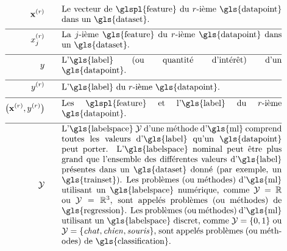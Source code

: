 \begin{align}
	\featurevec^{(\sampleidx)} \quad\quad &\parbox{.75\textwidth}{Le vecteur de \glspl{feature} du $\sampleidx$-ième \gls{datapoint} dans un \gls{dataset}. } \nonumber \\[2mm] \hline \nonumber\\[-5mm]
	\feature_{\featureidx}^{(\sampleidx)}\quad\quad &\parbox{.75\textwidth}{La $\featureidx$-ième \gls{feature} du $\sampleidx$-ième 
		\gls{datapoint} dans un \gls{dataset}.} \nonumber  \\[2mm] \hline \nonumber\\[-5mm]
	\truelabel \quad\quad &\parbox{.75\textwidth}{L'\gls{label} (ou quantité d’intérêt) d’un \gls{datapoint}.} \nonumber \\[2mm] \hline \nonumber\\[-5mm]
	\truelabel^{(\sampleidx)} \quad\quad &\parbox{.75\textwidth}{L'\gls{label} du $\sampleidx$-ième \gls{datapoint}.} \nonumber \\[2mm] \hline \nonumber\\[-5mm]
	\big(\featurevec^{(\sampleidx)},\truelabel^{(\sampleidx)}\big)  \quad\quad &\parbox{.75\textwidth}{Les \glspl{feature} et l'\gls{label} du $\sampleidx$-ième \gls{datapoint}.}\nonumber \\[2mm] \hline \nonumber\\[-5mm]
	\labelspace  \quad\quad & \parbox{.75\textwidth}{L’\gls{labelspace} $\labelspace$ d’une méthode d’\gls{ml} comprend toutes les valeurs d'\gls{label} qu’un \gls{datapoint} peut porter. L’\gls{labelspace} nominal peut être plus grand que l’ensemble des différentes valeurs d'\gls{label} présentes dans un \gls{dataset} donné (par exemple, un \gls{trainset}). Les problèmes (ou méthodes) d'\gls{ml} utilisant un \gls{labelspace} numérique, comme $\labelspace=\mathbb{R}$ ou $\labelspace=\mathbb{R}^{3}$, sont appelés problèmes (ou méthodes) de \gls{regression}. Les problèmes (ou méthodes) d'\gls{ml} utilisant un \gls{labelspace} discret, comme $\labelspace=\{0,1\}$ ou $\labelspace=\{\mbox{\emph{chat}},\mbox{\emph{chien}},\mbox{\emph{souris}}\}$, sont appelés problèmes (ou méthodes) de \gls{classification}.}  \nonumber
\end{align}
                  


